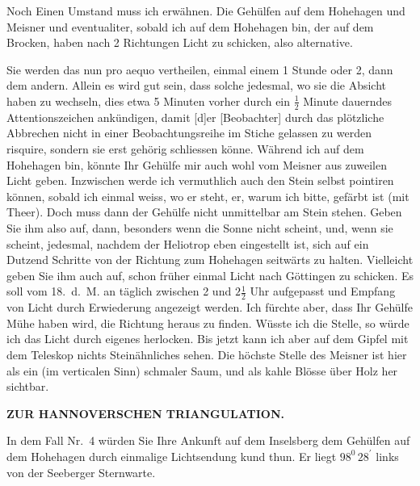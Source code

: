 \par\noindent\hspace*{\parindent}Noch Einen Umstand muss ich erwähnen.
Die Gehülfen auf dem Hohehagen und Meisner und eventualiter, sobald ich auf dem Hohehagen bin, der auf dem Brocken, haben nach 2 Richtungen Licht zu schicken, also alternative.
\par\noindent\hspace*{\parindent}Sie werden das nun pro aequo vertheilen, einmal einem 1 Stunde oder 2, dann dem andern.
Allein es wird gut sein, dass solche jedesmal, wo sie die Absicht haben zu wechseln, dies etwa 5 Minuten vorher durch ein \(\frac{1}{2}\) Minute dauerndes Attentionszeichen ankündigen, damit [d]er [Beobachter] durch das plötzliche Abbrechen nicht in einer Beobachtungsreihe im Stiche gelassen zu werden risquire, sondern sie erst gehörig schliessen könne.
Während ich auf dem Hohehagen bin, könnte Ihr Gehülfe mir auch wohl vom Meisner aus zuweilen Licht geben.
Inzwischen werde ich vermuthlich auch den Stein selbst pointiren können, sobald ich einmal weiss, wo er steht,  er, warum ich bitte,  gefärbt ist (mit Theer).
Doch muss dann der Gehülfe nicht unmittelbar am Stein stehen.
Geben Sie ihm also auf, dann, besonders  wenn die Sonne nicht scheint, und, wenn sie scheint, jedesmal, nachdem der Heliotrop eben eingestellt ist, sich auf ein Dutzend Schritte von der Richtung zum Hohehagen seitwärts zu halten.
Vielleicht geben Sie ihm auch auf, schon früher einmal Licht nach Göttingen zu schicken.
Es soll vom 18.~d.~M. an täglich zwischen 2 und \(2\frac{1}{2}\) Uhr aufgepasst und Empfang von Licht durch Erwiederung angezeigt werden.
Ich fürchte aber, dass Ihr Gehülfe Mühe haben wird, die Richtung heraus zu finden.
Wüsste ich die Stelle, so würde ich das Licht durch eigenes herlocken.
Bis jetzt kann ich aber auf dem Gipfel mit dem Teleskop nichts Steinähnliches sehen.
Die höchste Stelle des Meisner ist hier als ein (im verticalen Sinn) schmaler Saum, und als kahle Blösse über Holz her sichtbar.
\par\clearpage
\noindent\null\hfill{\small\textbf{ZUR HANNOVERSCHEN TRIANGULATION.}}\hfill{}\par\medskip
\par\noindent\hspace*{\parindent}In dem Fall Nr.~4 würden Sie Ihre Ankunft auf dem Inselsberg dem Gehülfen auf dem Hohehagen durch einmalige Lichtsendung kund thun.
Er liegt \(98^{0}\,28^{\prime}\) links von der Seeberger Sternwarte.
